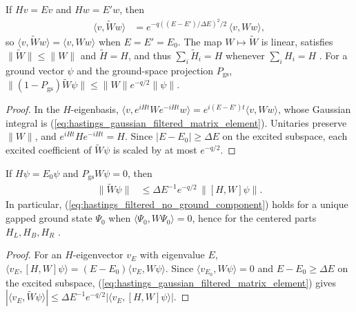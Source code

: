 \begin{lemma}
    \label{thm:hastings_gaussian_filtered_spectral}
    \leanok
    If $Hv=Ev$ and $Hw=E'w$, then
    \begin{align}
        \langle v,\widetilde Ww\rangle
         & =e^{-q((E-E')/\Delta E)^2/2}\,\langle v,Ww\rangle,
        \label{eq:hastings_gaussian_filtered_matrix_element}
    \end{align}
    so $\langle v,\widetilde Ww\rangle=\langle v,Ww\rangle$ when $E=E'=E_0$.
    The map $W\mapsto\widetilde W$ is linear, satisfies
    $\|\widetilde W\|\le\|W\|$ and $\widetilde H=H$, and thus
    $\sum_i\widetilde H_i=H$ whenever $\sum_iH_i=H$
    \cite[line 793]{Hastings2007AreaLaw}. For a ground vector $\psi$ and the
    ground-space projection $P_{\mathrm{gs}}$,
    $\|(1-P_{\mathrm{gs}})\widetilde W\psi\|\le\|W\|e^{-q/2}\|\psi\|$.
\end{lemma}
\begin{proof}\leanok
    In the $H$-eigenbasis, $\langle v,e^{iHt}We^{-iHt}w\rangle
        =e^{i(E-E')t}\langle v,Ww\rangle$, whose Gaussian integral is
    (\ref{eq:hastings_gaussian_filtered_matrix_element}). Unitaries preserve
    $\|W\|$, and $e^{iHt}He^{-iHt}=H$. Since $|E-E_0|\ge\Delta E$ on the
    excited subspace, each excited coefficient of $\widetilde W\psi$ is scaled
    by at most $e^{-q/2}$.
\end{proof}

\begin{lemma}
    \label{thm:hastings_filtered_no_ground_component}
    \leanok
    If $H\psi=E_0\psi$ and $P_{\mathrm{gs}}W\psi=0$, then
    \begin{align}
        \|\widetilde W\psi\| & \le\Delta E^{-1}e^{-q/2}\,\|[H,W]\psi\|.
        \label{eq:hastings_filtered_no_ground_component}
    \end{align}
    In particular, (\ref{eq:hastings_filtered_no_ground_component}) holds for a
    unique gapped ground state $\Psi_0$ when $\langle\Psi_0,W\Psi_0\rangle=0$,
    hence for the centered parts $H_L,H_B,H_R$
    \cite[lines 794--815]{Hastings2007AreaLaw}.
\end{lemma}
\begin{proof}\leanok
    For an $H$-eigenvector $v_E$ with eigenvalue $E$,
    $\langle v_E,[H,W]\psi\rangle=(E-E_0)\langle v_E,W\psi\rangle$. Since
    $\langle v_{E_0},W\psi\rangle=0$ and $E-E_0\ge\Delta E$ on the excited
    subspace, (\ref{eq:hastings_gaussian_filtered_matrix_element}) gives
    $|\langle v_E,\widetilde W\psi\rangle|
        \le\Delta E^{-1}e^{-q/2}|\langle v_E,[H,W]\psi\rangle|$.
\end{proof}

